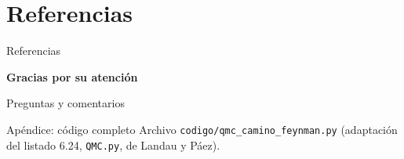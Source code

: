 \documentclass[aspectratio=169, 11pt]{beamer}
\begin{document}
\section*{Referencias}

\begin{frame}[allowframebreaks]{Referencias}
  \scriptsize
  \printbibliography[heading=none]
\end{frame}

\begin{frame}[plain]
  \centering
  \vfill
  {\Large \textbf{Gracias por su atención}}

  \vspace{1cm}
  {\normalsize Preguntas y comentarios}
  \vfill
\end{frame}

\appendix

\begin{frame}{Apéndice: código completo}
  \scriptsize
  Archivo \texttt{codigo/qmc\_camino\_feynman.py} (adaptación del listado 6.24,
  \texttt{QMC.py}, de Landau y Páez).
  \vspace{0.2cm}
  
\end{frame}
\end{document}
